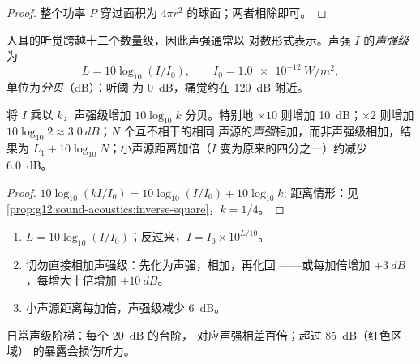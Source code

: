 \begin{proof}
整个功率 $P$ 穿过面积为 $4\pi r^2$ 的球面；两者相除即可。
\end{proof}

\begin{definition}[声强级]\label{def:g12:sound-acoustics:level}
人耳的听觉跨越十二个数量级，因此声强通常以
对数形式表示。声强 $I$ 的\emph{声强级}为
\[ L = 10 \log_{10}(I/I_0), \qquad I_0 = \qty{1.0e-12}{W/m^2}, \]
单位为\emph{分贝}（\unit{dB}）：听阈
为 \qty{0}{dB}，痛觉约在 \qty{120}{dB} 附近。
\end{definition}

\begin{proposition}[分贝运算]\label{prop:g12:sound-acoustics:db-arithmetic}
将 $I$ 乘以 $k$，声强级增加 $10\log_{10}k$ 分贝。特别地
$\times 10$ 则增加 \qty{10}{dB}；$\times 2$ 则增加
$10\log_{10}2 \approx \qty{3.0}{dB}$；$N$ 个互不相干的相同
声源的\emph{声强}相加，而非声强级相加，结果为
$L_1 + 10\log_{10}N$；小声源距离加倍（$I$
变为原来的四分之一）约减少 \qty{6.0}{dB}。
\end{proposition}

\begin{proof}
$10\log_{10}(kI/I_0) = 10\log_{10}(I/I_0) + 10\log_{10}k$;
距离情形：见\cref{prop:g12:sound-acoustics:inverse-square}，$k = 1/4$。
\end{proof}

\begin{method}[分贝运算]\label{met:g12:sound-acoustics:db}
\begin{enumerate}
  \item $L = 10\log_{10}(I/I_0)$；反过来，$I = I_0 \times 10^{L/10}$。
  \item 切勿直接相加声强级：先化为声强，相加，再化回
——或每加倍增加 $+\qty{3}{dB}$，每增大十倍增加 $+\qty{10}{dB}$。
  \item 小声源距离每加倍，声强级减少 \qty{6}{dB}。
\end{enumerate}
\end{method}

\begin{omfigure}

{\small 日常声级阶梯：每个 \qty{20}{dB} 的台阶，
对应声强相差百倍；超过 \qty{85}{dB}（红色区域）
的暴露会损伤听力。}
\end{omfigure}

